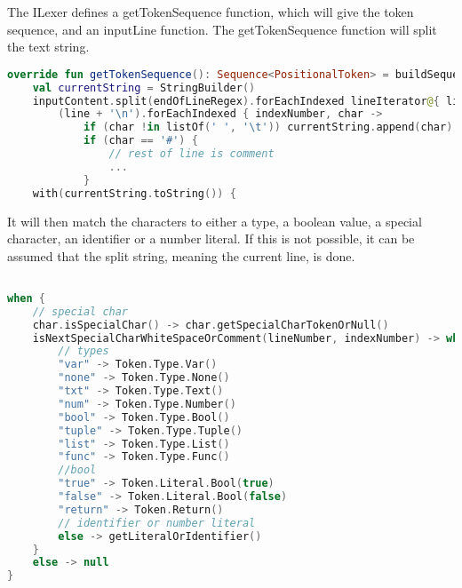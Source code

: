 The ILexer defines a getTokenSequence function, which will give the token sequence, and an inputLine function.
The getTokenSequence function will split the text string.
\begin{lstlisting}[language=Kotlin,label=lis:LexerStringSplit,caption=The string is being split and new lines are added to the string .,firstnumber=8]
override fun getTokenSequence(): Sequence<PositionalToken> = buildSequence {
	val currentString = StringBuilder()
	inputContent.split(endOfLineRegex).forEachIndexed lineIterator@{ lineNumber, line ->
		(line + '\n').forEachIndexed { indexNumber, char ->
			if (char !in listOf(' ', '\t')) currentString.append(char)
			if (char == '#') {
				// rest of line is comment
				...
			}
	with(currentString.toString()) {
\end{lstlisting}		
It will then match the characters to either a type, a boolean value, a special character, an identifier or a number literal.
If this is not possible, it can be assumed that the split string, meaning the current line, is done.
\begin{lstlisting}[language=Kotlin,label=lis:LexerStringMatcher,caption=The split string is being matched to a token,firstnumber=19]

when {
	// special char
	char.isSpecialChar() -> char.getSpecialCharTokenOrNull()
	isNextSpecialCharWhiteSpaceOrComment(lineNumber, indexNumber) -> when (this) {
		// types
		"var" -> Token.Type.Var()
		"none" -> Token.Type.None()
		"txt" -> Token.Type.Text()
		"num" -> Token.Type.Number()
		"bool" -> Token.Type.Bool()
		"tuple" -> Token.Type.Tuple()
		"list" -> Token.Type.List()
		"func" -> Token.Type.Func()
		//bool
		"true" -> Token.Literal.Bool(true)
		"false" -> Token.Literal.Bool(false)
		"return" -> Token.Return()
		// identifier or number literal
		else -> getLiteralOrIdentifier()
	}
	else -> null
}
\end{lstlisting}
